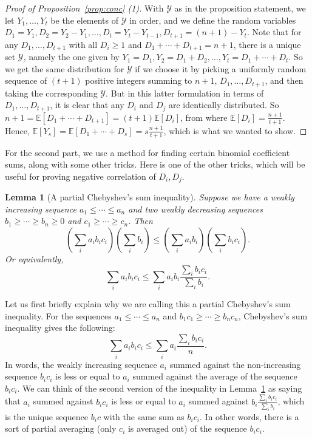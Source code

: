 \documentclass{amsart}
\newtheorem{lemma}[theorem]{Lemma}
\theoremstyle{definition}
\begin{document}
\begin{proof}[Proof of Proposition~\ref{prop:conc} (1)] With $\mathcal{Y}$ as in the proposition statement, we let $Y_1, \ldots, Y_t$ be the elements of $\mathcal{Y}$ in order, and we define the random variables $D_1=Y_1, D_2=Y_2-Y_1, \ldots, D_{t}=Y_t-Y_{t-1}, D_{t+1}=(n+1)-Y_t$. Note that for any $D_1,\ldots, D_{t+1}$ with all $D_i\geq 1$ and $D_1+\cdots+D_{t+1}=n+1$, there is a unique set $\mathcal{Y}$, namely the one given by $Y_1=D_1, Y_2=D_1+D_2,\ldots, Y_t=D_1+\cdots+D_t$. So we get the same distribution for $\mathcal{Y}$ if we choose it by picking a uniformly random sequence of $(t+1)$ positive integers summing to $n+1$, $D_1,\ldots,D_{t+1}$, and then taking the corresponding $\mathcal{Y}$. But in this latter formulation in terms of $D_1,\ldots, D_{t+1}$, it is clear that any $D_i$ and $D_j$ are identically distributed. So $n+1=\mathbb{E}[D_1+\cdots+D_{t+1}]=(t+1)\mathbb{E}[D_i]$, from where $\mathbb{E}[D_i]=\frac{n+1}{t+1}$. Hence, $\mathbb{E}[Y_s]=\mathbb{E}[D_1+\cdots+D_s]=s\frac{n+1}{t+1}$, which is what we wanted to show.
\end{proof}

For the second part, we use a method for finding certain binomial coefficient sums, along with some other tricks. Here is one of the other tricks, which will be useful for proving negative correlation of $D_i,D_j$.

\begin{lemma}[A partial Chebyshev's sum inequality]\label{lem:cheb}
Suppose we have a weakly increasing sequence $a_1\leq \cdots \leq  a_n$ and two weakly decreasing sequences $b_1 \geq \cdots \geq b_n\geq 0$ and $c_1\geq \cdots\geq c_n$. Then \[\left(\sum_i a_i b_i c_i\right)\left(\sum_i b_i\right)\leq \left(\sum_i a_i b_i\right)\left(\sum_i b_i c_i \right).\]
Or equivalently,
\[\sum_i a_i b_i c_i \leq \sum_i a_i b_i \frac{\sum_i b_i c_i}{\sum_i b_i}.\]
\end{lemma}
Let us first briefly explain why we are calling this a partial Chebyshev's sum inequality. For the sequences $a_1\leq \cdots \leq a_n$ and $b_1 c_1 \geq \cdots \geq b_n c_n$, Chebyshev's sum inequality gives the following:
\[\sum_i a_i b_i c_i \leq \sum_i a_i \frac{\sum_i b_i c_i}{n}.\]
In words, the weakly increasing sequence $a_i$ summed against the non-increasing sequence $b_i c_i$ is less or equal to $a_i$ summed against the average of the sequence $b_i c_i$. We can think of the second version of the inequality in Lemma~\ref{lem:cheb} as saying that $a_i$ summed against $b_i c_i$ is less or equal to $a_i$ summed against $b_i \frac{\sum_i b_i c_i}{\sum_i b_i}$, which is the unique sequence $b_i c$ with the same sum as $b_i c_i$. In other words, there is a sort of partial averaging (only $c_i$ is averaged out) of the sequence $b_i c_i$.
\end{document}
